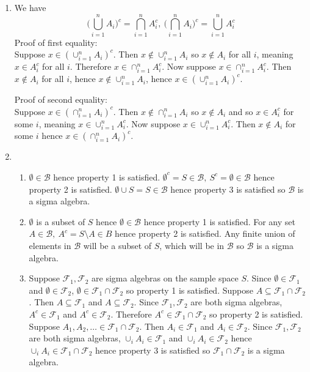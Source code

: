\documentclass{article}
\begin{document}
\begin{enumerate}
    \item We have \[
    \Big( \bigcup_{i = 1}^{n} A_i \Big)^{c} = \bigcap_{i = 1}^{n} A_{i}^{c}, \
    \Big( \bigcap_{i = 1}^{n} A_i \Big)^{c} = \bigcup_{i = 1}^{n} A_{i}^{c}
    \]
    Proof of first equality: \\
    Suppose $x \in (\cup_{i = 1}^{n} A_i)^c$. Then $x \notin \cup_{i = 1}^{n} A_i$ so
    $x \notin A_i$ for all $i$, meaning $x \in A_{i}^{c}$ for all $i$. Therefore
    $x \in \cap_{i = 1}^{n} A_{i}^{c}$.
    Now suppose $x \in \cap_{i = 1}^{n} A_{i}^{c}$.
    Then $x \notin A_i$ for all $i$, hence $x \notin \cup_{i = 1}^{n} A_{i}$, hence
    $x \in (\cup_{i = 1}^{n} A_i)^c$.

    Proof of second equality: \\
    Suppose $x \in (\cap_{i = 1}^{n} A_i)^{c}$. Then $x \notin \cap_{i = 1}^{n} A_i$ so
    $x \notin A_i$ and so $x \in A_{i}^{c}$ for some $i$, meaning
    $x \in \cup_{i = 1}^{n} A_i^c$.
    Now suppose $x \in \cup_{i = 1}^{n} A_i^c$. Then $x \notin A_i$ for some $i$ hence
    $x \in (\cap_{i = 1}^{n} A_i)^{c}$.

    \item \begin{enumerate}
        \item $\emptyset \in \mathcal{B}$ hence property 1 is satisfied.
        $\emptyset^{c} = S \in \mathcal{B}, \ S^{c} = \emptyset \in \mathcal{B}$ hence
        property 2 is satisfied. $\emptyset \cup S = S \in \mathcal{B}$ hence property
        3 is satisfied so $\mathcal{B}$ is a sigma algebra.

        \item $\emptyset$ is a subset of $S$ hence $\emptyset \in \mathcal{B}$ hence property
        1 is satisfied. For any set $A \in \mathcal{B}, \ A^{c} = S \setminus A \in B$ hence
        property 2 is satisfied. Any finite union of elements in $\mathcal{B}$ will be a
        subset of $S$, which will be in $\mathcal{B}$ so $\mathcal{B}$ is a sigma algebra.

        \item Suppose $\mathcal{F}_1, \mathcal{F}_2$ are sigma algebras on the sample space
        $S$. Since $\emptyset \in \mathcal{F}_1$ and $\emptyset \in \mathcal{F}_2$,
        $\emptyset \in \mathcal{F}_1 \cap \mathcal{F}_2$ so property 1 is satisfied.
        Suppose $A \subseteq \mathcal{F}_1 \cap \mathcal{F}_2$. Then $A \subseteq \mathcal{F}_1$
        and $A \subseteq \mathcal{F}_2$. Since $\mathcal{F}_1, \mathcal{F}_2$ are both sigma
        algebras, $A^{c} \in \mathcal{F}_1$ and $A^{c} \in \mathcal{F}_2$. Therefore
        $A^{c} \in \mathcal{F}_1 \cap \mathcal{F}_2$ so property 2 is satisfied.
        Suppose $A_1, A_2, \dots \in \mathcal{F}_1 \cap \mathcal{F}_2$. Then
        $A_i \in \mathcal{F}_1$ and $A_i \in \mathcal{F}_2$. Since $\mathcal{F}_1,
        \mathcal{F}_2$ are both sigma algebras, $\cup_{i} A_i \in \mathcal{F}_1$ and
        $\cup_{i} A_i \in \mathcal{F}_2$ hence $\cup_{i} A_i \in \mathcal{F}_1
        \cap \mathcal{F}_2$ hence property 3 is satisfied so $\mathcal{F}_1 \cap \mathcal{F}_2$
        is a sigma algebra.
    \end{enumerate}


\end{enumerate}
\end{document}

